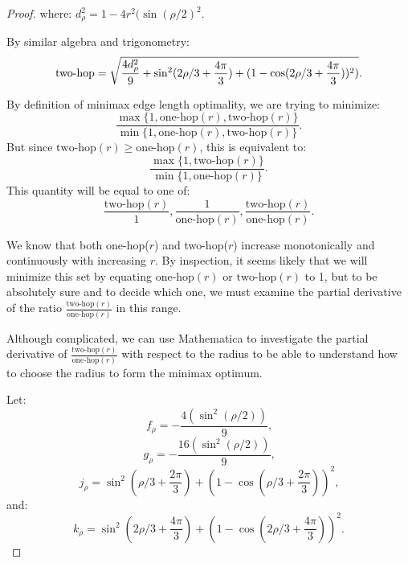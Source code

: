 \documentclass[twocolumn,10pt]{asme2ej}
\begin{document}
\begin{proof}
where: $  d_{\rho}^2 = 1 - 4 r^2 (\sin( \rho / 2)^2$.


By similar algebra and trigonometry:
\begin{equation}
  \text{two-hop}  = \sqrt{\frac{4 d_{\rho}^2}{9} +  \sin^2(2\rho/3 + \frac{4\pi}{3})  + (1 - \cos(2\rho/3 + \frac{4\pi}{3}))^2)} \text{.}\\
\end{equation}


By definition of minimax edge length optimality, we are trying to minimize:
\[
\frac{\max{\{1,\text{one-hop}(r),\text{two-hop}(r)}\}}{\min{\{1,\text{one-hop}(r),\text{two-hop}(r)}\}} \text{.}
\]
But since $\text{two-hop}(r) \geq \text{one-hop}(r)$, this is equivalent to:
\[
 \frac{   \max \{1,\text{two-hop}(r)\}}
      {   \min \{1,\text{one-hop}(r)\}} \text{.}
\]
This quantity will be equal to one of:
\begin{equation}
  \frac{\text{two-hop}(r)}{1},
\frac{1}{\text{one-hop}(r)},
\frac{\text{two-hop}(r)}{\text{one-hop}(r)} \text{.}
\label{eq:ratioset}
\end{equation}

We know that both one-hop($r$) and two-hop($r$) increase monotonically and continuously with increasing $r$.
By inspection, it seems likely that we will minimize this set by equating $\text{one-hop}(r)$ or $\text{two-hop}(r)$
to 1, but to be absolutely sure and to decide which one, we must examine the partial derivative of the ratio
 $\frac{\text{two-hop}(r)}{\text{one-hop}(r)}$ in this range.

Although complicated, we can use Mathematica to investigate
the partial derivative of $\frac{\text{two-hop}(r)}{\text{one-hop}(r)}$ with respect
to the radius to be able to understand how to choose the radius to form the minimax optimum.

Let:
\begin{equation}
  f_{\rho} = -\frac{4 (\sin^2( \rho / 2))}{9} \text{,}
  \end{equation}
\begin{equation}
  g_{\rho} = -\frac{16 (\sin^2( \rho / 2))}{9} \text{,}
\end{equation}
\begin{equation}
  j_{\rho} = \sin^2(\rho/3+ \frac{2\pi}{3})  + (1 - \cos(\rho/3 + \frac{2\pi}{3}))^2 \text{,}
\end{equation}
and:
\begin{equation}
  k_{\rho} = \sin^2(2\rho/3 + \frac{4\pi}{3})  + (1 - \cos(2\rho/3 + \frac{4\pi}{3}))^2 \text{.}
\end{equation}


\end{proof}
\end{document}
